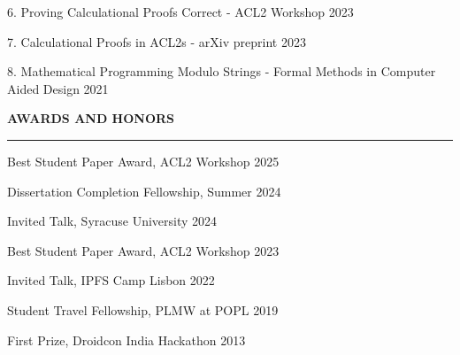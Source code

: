\documentclass[11pt,letterpaper]{article}
\newcommand{\cvsection}[1]{
    \vspace{0.5em}
    \textbf{\large #1}
    \vspace{0.2em}
    \hrule
    \vspace{0.3em}
}
\begin{document}
6. Proving Calculational Proofs Correct - ACL2 Workshop 2023

7. Calculational Proofs in ACL2s - arXiv preprint 2023

8. Mathematical Programming Modulo Strings - Formal Methods in Computer Aided Design 2021

\cvsection{AWARDS AND HONORS}

Best Student Paper Award, ACL2 Workshop 2025

Dissertation Completion Fellowship, Summer 2024

Invited Talk, Syracuse University 2024

Best Student Paper Award, ACL2 Workshop 2023

Invited Talk, IPFS Camp Lisbon 2022

Student Travel Fellowship, PLMW at POPL 2019

First Prize, Droidcon India Hackathon 2013
\end{document}
